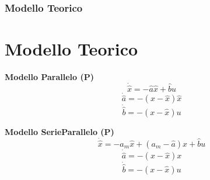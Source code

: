\documentclass{beamer}
\begin{document}
\begin{frame}
    \frametitle{Modello Teorico}
    \section{Modello Teorico}
    \begin{minipage}{0.45\textwidth}
        \begin{center}
            \textbf{Modello Parallelo (P)}
            \begin{equation*}
                \dot{\hat{x}}=-\hat{a}\hat{x}+\hat{b}u
            \end{equation*}
            \begin{equation*}
                \dot{\hat{a}}=-(x-\hat{x})\hat{x}
            \end{equation*}
            \begin{equation*}
                \dot{\hat{b}}=-(x-\hat{x})u
            \end{equation*}
        \end{center}
    \end{minipage}
    \begin{minipage}{0.45\textwidth}
        \begin{center}
            \textbf{Modello SerieParallelo (P)}
            \begin{equation*}
                \dot{\hat{x}}=-a_{m}\hat{x}+(a_{m}-\hat{a})x+\hat{b}u
            \end{equation*}
            \begin{equation*}
                \dot{\hat{a}}=-(x-\hat{x})x
            \end{equation*}
            \begin{equation*}
                \dot{\hat{b}}=-(x-\hat{x})u
            \end{equation*}
        \end{center}
    \end{minipage}
\end{frame}
\end{document}
